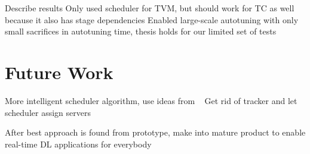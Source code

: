 Describe results
Only used scheduler for TVM, but should work for TC as well because it also has stage dependencies
Enabled large-scale autotuning with only small sacrifices in autotuning time, thesis holds for our limited set of tests

\section{Future Work}
More intelligent scheduler algorithm, use ideas from ~\cite{Ma.2005}
Get rid of tracker and let scheduler assign servers

After best approach is found from prototype, make into mature product to enable real-time DL applications for everybody